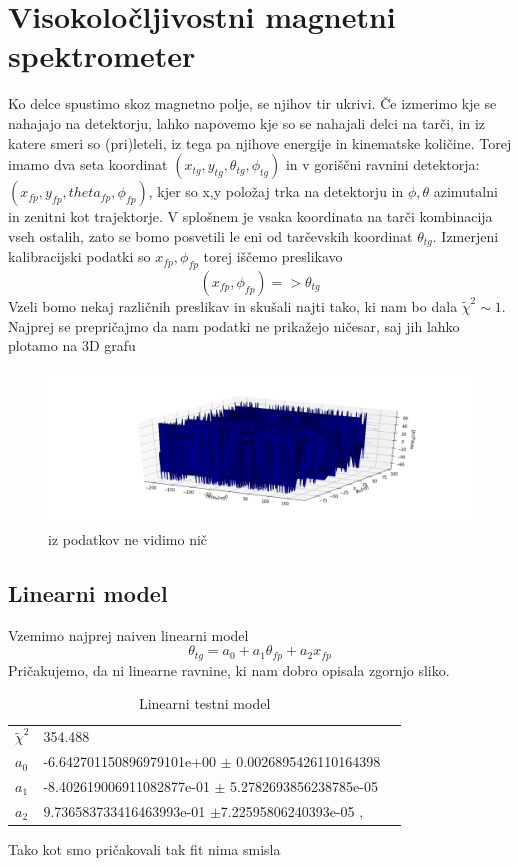 \documentclass[11pt, a4paper]{article}
\begin{document}
\section{Visokoločljivostni magnetni spektrometer}
Ko delce spustimo skoz magnetno polje, se njihov tir ukrivi. Če izmerimo kje se nahajajo na detektorju, lahko napovemo kje so se nahajali delci na tarči, in iz katere smeri so (pri)leteli, 
iz tega pa njihove energije in kinematske količine.\newline
Torej imamo dva seta koordinat $(x_{tg},y_{tg},\theta_{tg},\phi_{tg})$ in v goriščni ravnini detektorja: $(x_{fp},y_{fp},theta_{fp},\phi_{fp})$, kjer so x,y položaj trka na detektorju in $\phi,\theta$ azimutalni in zenitni kot trajektorje. V splošnem je vsaka koordinata na tarči kombinacija vseh ostalih, zato se bomo posvetili le eni od tarčevskih koordinat $\theta_{tg}$. Izmerjeni kalibracijski podatki so $x_{fp}, \phi_{fp}$ torej iščemo preslikavo
\begin{equation}
(x_{fp}, \phi_{fp}) => \theta_{tg}
\end{equation}
Vzeli bomo nekaj različnih preslikav in skušali najti tako, ki nam bo dala $\widetilde{\chi}^2 \sim 1 $. Najprej se prepričajmo da nam podatki ne prikažejo ničesar, saj jih lahko plotamo na 3D grafu
\begin{figure}[H]
\hspace*{-2cm}     
  \includegraphics[width=15cm]{aa.png}
  \caption{iz podatkov ne vidimo nič} 
\end{figure}
\subsection{Linearni model}
Vzemimo najprej naiven linearni model 
\begin{equation}
\theta_{tg} = a_0 + a_1 \theta_{fp} + a_2 x_{fp}
\end{equation}
Pričakujemo, da ni linearne ravnine, ki nam dobro opisala zgornjo sliko.
\begin{table}[H]
\centering
\caption{Linearni testni model}
\label{my-label}
\begin{tabular}{lll}
	$\widetilde{\chi}^2$ & 354.488
&  \\
 $a_0$ & -6.642701150896979101e+00 $\pm$ 0.0026895426110164398&   \\
 $a_1$ & -8.402619006911082877e-01 $\pm$ 5.2782693856238785e-05&  \\
 $a_2$ & 9.736583733416463993e-01 $\pm$7.22595806240393e-05   , 
\end{tabular}
\end{table}
Tako kot smo pričakovali tak fit nima smisla
\end{document}
